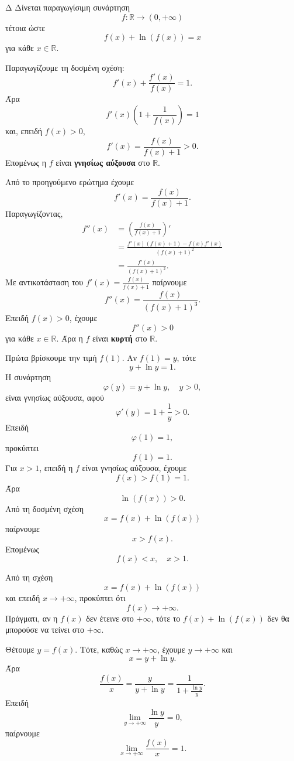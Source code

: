 \begin{thema}{Δ}
Δίνεται παραγωγίσιμη συνάρτηση
\[
f:\mathbb{R}\to(0,+\infty)
\]
τέτοια ώστε
\[
f(x)+\ln(f(x))=x
\]
για κάθε $x\in\mathbb{R}$.
\begin{erwthma}
\item Παραγωγίζουμε τη δοσμένη σχέση:
\[
f'(x)+\frac{f'(x)}{f(x)}=1.
\]
Άρα
\[
f'(x)\left(1+\frac{1}{f(x)}\right)=1
\]
και, επειδή $f(x)>0$,
\[
f'(x)=\frac{f(x)}{f(x)+1}>0.
\]
Επομένως η $f$ είναι \textbf{γνησίως αύξουσα} στο $\mathbb{R}$.

\item Από το προηγούμενο ερώτημα έχουμε
\[
f'(x)=\frac{f(x)}{f(x)+1}.
\]
Παραγωγίζοντας,
\begin{align*}
f''(x)
&=\left(\frac{f(x)}{f(x)+1}\right)'\\
&=\frac{f'(x)(f(x)+1)-f(x)f'(x)}{(f(x)+1)^2}\\
&=\frac{f'(x)}{(f(x)+1)^2}.
\end{align*}
Με αντικατάσταση του $f'(x)=\frac{f(x)}{f(x)+1}$ παίρνουμε
\[
f''(x)=\frac{f(x)}{(f(x)+1)^3}.
\]
Επειδή $f(x)>0$, έχουμε
\[
f''(x)>0
\]
για κάθε $x\in\mathbb{R}$. Άρα η $f$ είναι \textbf{κυρτή} στο $\mathbb{R}$.

\item Πρώτα βρίσκουμε την τιμή $f(1)$. Αν $f(1)=y$, τότε
\[
y+\ln y=1.
\]
Η συνάρτηση
\[
\varphi(y)=y+\ln y,\quad y>0,
\]
είναι γνησίως αύξουσα, αφού
\[
\varphi'(y)=1+\frac{1}{y}>0.
\]
Επειδή
\[
\varphi(1)=1,
\]
προκύπτει
\[
f(1)=1.
\]
Για $x>1$, επειδή η $f$ είναι γνησίως αύξουσα, έχουμε
\[
f(x)>f(1)=1.
\]
Άρα
\[
\ln(f(x))>0.
\]
Από τη δοσμένη σχέση
\[
x=f(x)+\ln(f(x))
\]
παίρνουμε
\[
x>f(x).
\]
Επομένως
\[
{f(x)<x,\quad x>1}.
\]

\item Από τη σχέση
\[
x=f(x)+\ln(f(x))
\]
και επειδή $x\to+\infty$, προκύπτει ότι
\[
f(x)\to+\infty.
\]
Πράγματι, αν η $f(x)$ δεν έτεινε στο $+\infty$, τότε το $f(x)+\ln(f(x))$ δεν θα μπορούσε να τείνει στο $+\infty$.

Θέτουμε $y=f(x)$. Τότε, καθώς $x\to+\infty$, έχουμε $y\to+\infty$ και
\[
x=y+\ln y.
\]
Άρα
\[
\frac{f(x)}{x}=\frac{y}{y+\ln y}
=\frac{1}{1+\frac{\ln y}{y}}.
\]
Επειδή
\[
\lim_{y\to+\infty}\frac{\ln y}{y}=0,
\]
παίρνουμε
\[
{\lim_{x\to+\infty}\frac{f(x)}{x}=1}.
\]
\end{erwthma}
\end{thema}
